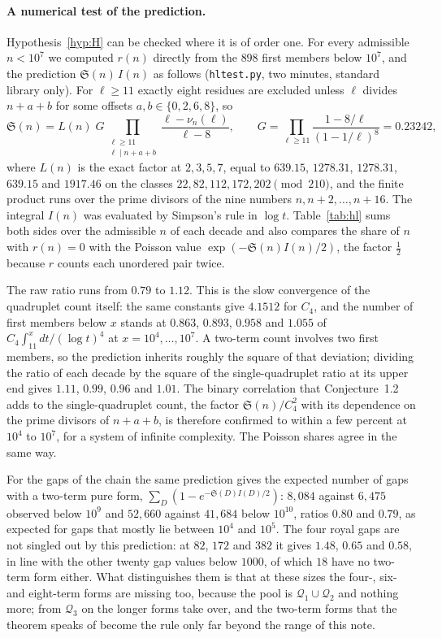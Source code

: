 \documentclass[11pt,a4paper]{article}
\newcommand{\Q}{\mathcal{Q}}
\newcommand{\code}[1]{\texttt{#1}}
\begin{document}
\paragraph{A numerical test of the prediction.}
Hypothesis~\ref{hyp:H} can be checked where it is of order one. For
every admissible $n<10^7$ we computed $r(n)$ directly from the $898$ first
members below $10^7$, and the prediction $\mathfrak S(n)\,I(n)$ as follows
(\code{hltest.py}, two minutes, standard library only). For $\ell\ge11$
exactly eight residues are excluded unless $\ell$ divides $n+a+b$ for some
offsets $a,b\in\{0,2,6,8\}$, so
\[
\mathfrak S(n)=L(n)\;G\prod_{\substack{\ell\ge11\\ \ell\mid n+a+b}}
\frac{\ell-\nu_n(\ell)}{\ell-8},\qquad
G=\prod_{\ell\ge11}\frac{1-8/\ell}{(1-1/\ell)^8}=0.23242,
\]
where $L(n)$ is the exact factor at $2,3,5,7$, equal to $639.15$, $1278.31$,
$1278.31$, $639.15$ and $1917.46$ on the classes $22,82,112,172,202
\pmod{210}$, and the finite product runs over the prime divisors of the nine
numbers $n,n+2,\dots,n+16$. The integral $I(n)$ was evaluated by Simpson's
rule in $\log t$. Table~\ref{tab:hl} sums both sides over the admissible
$n$ of each decade and also compares the share of $n$ with $r(n)=0$ with
the Poisson value $\exp(-\mathfrak S(n)I(n)/2)$, the factor $\tfrac12$
because $r$ counts each unordered pair twice.

The raw ratio runs from $0.79$ to $1.12$. This is the slow convergence of
the quadruplet count itself: the same constants give $4.1512$ for $C_4$,
and the number of first members below $x$ stands at $0.863$, $0.893$,
$0.958$ and $1.055$ of $C_4\int_{11}^x dt/(\log t)^4$ at
$x=10^4,\dots,10^7$. A two-term count involves two first members, so the
prediction inherits roughly the square of that deviation; dividing the
ratio of each decade by the square of the single-quadruplet ratio at its
upper end gives $1.11$, $0.99$, $0.96$ and $1.01$. The binary correlation
that Conjecture~1.2 adds to the single-quadruplet count, the factor
$\mathfrak S(n)/C_4^2$ with its dependence on the prime divisors of $n+a+b$,
is therefore confirmed to within a few percent at $10^4$ to $10^7$, for a
system of infinite complexity. The Poisson shares agree in the same way.

For the gaps of the chain the same prediction gives the expected number of
gaps with a two-term pure form, $\sum_D(1-e^{-\mathfrak S(D)I(D)/2})$:
$8{,}084$ against $6{,}475$ observed below $10^9$ and $52{,}660$ against
$41{,}684$ below $10^{10}$, ratios $0.80$ and $0.79$, as expected for gaps
that mostly lie between $10^4$ and $10^5$. The four royal gaps are not
singled out by this prediction: at $82$, $172$ and $382$ it gives $1.48$,
$0.65$ and $0.58$, in line with the other twenty gap values below $1000$,
of which $18$ have no two-term form either. What distinguishes them is
that at these sizes the four-, six- and eight-term forms are missing too,
because the pool is $\Q_1\cup\Q_2$ and nothing more; from $\Q_3$ on the
longer forms take over, and the two-term forms that the theorem speaks of
become the rule only far beyond the range of this note.
\end{document}
